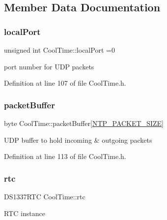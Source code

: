 \subsection{Member Data Documentation}
\mbox{\label{class_cool_time_a2f777da44d7ba678be8185299e9b49d1}} 
\subsubsection{\texorpdfstring{local\+Port}{localPort}}
{\footnotesize\ttfamily unsigned int Cool\+Time\+::local\+Port =0\hspace{0.3cm}{\ttfamily [private]}}

port number for U\+DP packets 

Definition at line 107 of file Cool\+Time.\+h.

\mbox{\label{class_cool_time_a27e6abc82a5c2f72161956967005bec7}} 
\subsubsection{\texorpdfstring{packet\+Buffer}{packetBuffer}}
{\footnotesize\ttfamily byte Cool\+Time\+::packet\+Buffer\mbox{[}\hyperlink{_cool_time_8h_a56a6ea64006651b4f42adf713e244f06}{N\+T\+P\+\_\+\+P\+A\+C\+K\+E\+T\+\_\+\+S\+I\+ZE}\mbox{]}\hspace{0.3cm}{\ttfamily [private]}}

U\+DP buffer to hold incoming \& outgoing packets 

Definition at line 113 of file Cool\+Time.\+h.

\mbox{\label{class_cool_time_abd38f2384ff90692b1568d9db869412e}} 
\subsubsection{\texorpdfstring{rtc}{rtc}}
{\footnotesize\ttfamily D\+S1337\+R\+TC Cool\+Time\+::rtc\hspace{0.3cm}{\ttfamily [private]}}

R\+TC instance 

